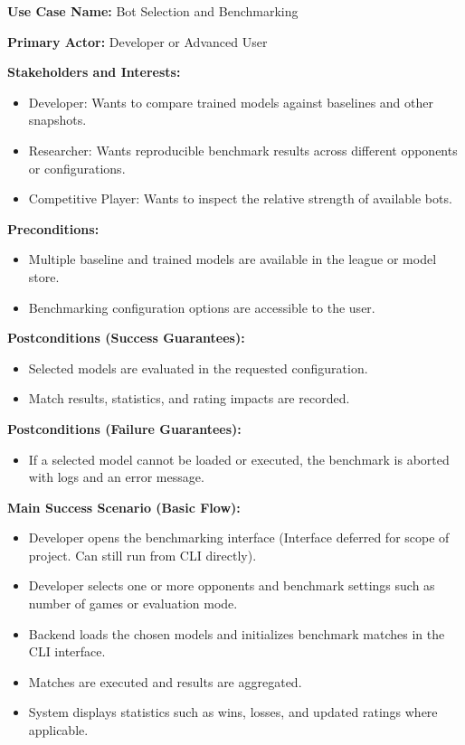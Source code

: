 \documentclass{article}
\begin{document}
\noindent\textbf{Use Case Name:} Bot Selection and Benchmarking

\noindent\textbf{Primary Actor:} Developer or Advanced User

\noindent\textbf{Stakeholders and Interests:}
\begin{itemize}
    \item Developer: Wants to compare trained models against baselines and other snapshots.
    \item Researcher: Wants reproducible benchmark results across different opponents or configurations.
    \item Competitive Player: Wants to inspect the relative strength of available bots.
\end{itemize}

\noindent\textbf{Preconditions:}
\begin{itemize}
    \item Multiple baseline and trained models are available in the league or model store.
    \item Benchmarking configuration options are accessible to the user.
\end{itemize}

\noindent\textbf{Postconditions (Success Guarantees):}
\begin{itemize}
    \item Selected models are evaluated in the requested configuration.
    \item Match results, statistics, and rating impacts are recorded.
\end{itemize}

\noindent\textbf{Postconditions (Failure Guarantees):}
\begin{itemize}
    \item If a selected model cannot be loaded or executed, the benchmark is aborted with logs and an error message.
\end{itemize}

\noindent\textbf{Main Success Scenario (Basic Flow):}
\begin{itemize}
    \item Developer opens the benchmarking interface (Interface deferred for scope of project. Can still run from CLI directly).
    \item Developer selects one or more opponents and benchmark settings such as number of games or evaluation mode.
    \item Backend loads the chosen models and initializes benchmark matches in the CLI interface.
    \item Matches are executed and results are aggregated.
    \item System displays statistics such as wins, losses, and updated ratings where applicable.
\end{itemize}
\end{document}
